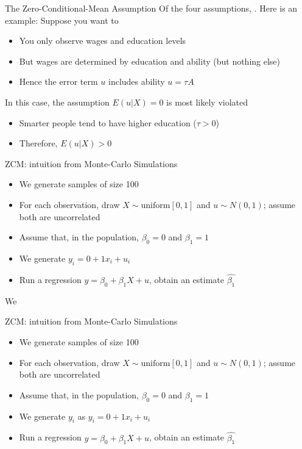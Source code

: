 \begin{frame}{The Zero-Conditional-Mean Assumption}
Of the four assumptions, . Here is an example:
\vfill
Suppose you want to 
\begin{itemize}
\item You only observe wages and education levels
\item But wages are determined by education and ability (but nothing else)
\item Hence the error term $u$ includes ability $u=\tau A$
\end{itemize}
\vfill
\pause
In this case, the assumption $E(u|X)=0$ is most likely violated
\begin{itemize}
\item Smarter people tend to have higher education ($\tau>0$)
\item Therefore, $E(u|X)>0$
\end{itemize}
\end{frame}


\begin{frame}{ZCM: intuition from Monte-Carlo Simulations}
\begin{itemize}
\item We generate samples of size 100
\item For each observation, draw $X\sim \mbox{uniform}[0,1] $ and $u\sim N(0,1)$; assume both are uncorrelated 
\pause
\item Assume that, in the population, $\beta_0=0$ and $\beta_1=1$
\item We generate $y_i=0+1 x_i + u_i$
\pause
\item Run a regression $y=\beta_0 + \beta_1 X + u$, obtain an estimate $\widehat{\beta_1}$
\end{itemize} 
\pause
We 
\end{frame}


\begin{frame}{ZCM: intuition from Monte-Carlo Simulations}
\begin{itemize}
\item We generate samples of size 100
\item For each observation, draw $X\sim \mbox{uniform}[0,1] $ and $u\sim N(0,1)$; assume both are uncorrelated 
\pause
\item Assume that, in the population, $\beta_0=0$ and $\beta_1=1$
\item We generate  $y_i$ as  $y_i=0+1 x_i + u_i$
\pause
\item Run a regression $y=\beta_0 + \beta_1 X + u$, obtain an estimate $\widehat{\beta_1}$
\end{itemize} 
\end{frame}



